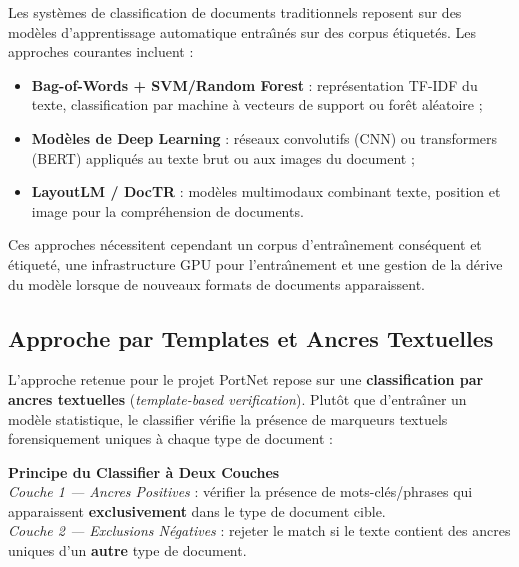 Les syst\`{e}mes de classification de documents traditionnels reposent sur des mod\`{e}les d'apprentissage automatique entra\^{\i}n\'{e}s sur des corpus \'{e}tiquet\'{e}s. Les approches courantes incluent :

\begin{itemize}[leftmargin=*, itemsep=4pt]
    \item \textbf{Bag-of-Words + SVM/Random Forest} : repr\'{e}sentation TF-IDF du texte, classification par machine \`{a} vecteurs de support ou for\^{e}t al\'{e}atoire ;
    \item \textbf{Mod\`{e}les de Deep Learning} : r\'{e}seaux convolutifs (CNN) ou transformers (BERT) appliqu\'{e}s au texte brut ou aux images du document ;
    \item \textbf{LayoutLM / DocTR} : mod\`{e}les multimodaux combinant texte, position et image pour la compr\'{e}hension de documents.
\end{itemize}

Ces approches n\'{e}cessitent cependant un corpus d'entra\^{\i}nement cons\'{e}quent et \'{e}tiquet\'{e}, une infrastructure GPU pour l'entra\^{\i}nement et une gestion de la d\'{e}rive du mod\`{e}le lorsque de nouveaux formats de documents apparaissent.

\subsection{Approche par Templates et Ancres Textuelles}

L'approche retenue pour le projet PortNet repose sur une \textbf{classification par ancres textuelles} (\textit{template-based verification}). Plut\^{o}t que d'entra\^{\i}ner un mod\`{e}le statistique, le classifier v\'{e}rifie la pr\'{e}sence de marqueurs textuels forensiquement uniques \`{a} chaque type de document :

\begin{successbox}
\textbf{Principe du Classifier \`{a} Deux Couches} \\
\textit{Couche 1 --- Ancres Positives} : v\'{e}rifier la pr\'{e}sence de mots-cl\'{e}s/phrases qui apparaissent \textbf{exclusivement} dans le type de document cible. \\
\textit{Couche 2 --- Exclusions N\'{e}gatives} : rejeter le match si le texte contient des ancres uniques d'un \textbf{autre} type de document.
\end{successbox}

